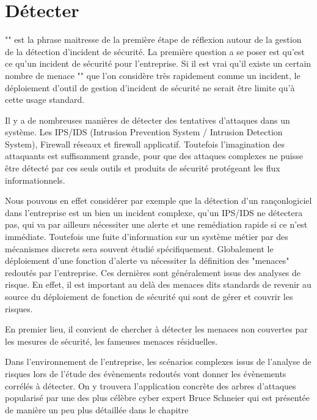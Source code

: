 \section{Détecter}

"" est la phrase maitresse de la première étape de réflexion autour de la gestion de la détection d'incident de sécurité.
La première question a se poser est qu'est ce qu'un incident de sécurité pour l'entreprise. Si il est vrai qu'il existe un certain nombre de menace "" que l'on considère très rapidement comme un incident, le déploiement d'outil de gestion d'incident de sécurité ne serait être limite qu'à cette usage standard.

Il y a de nombreuses manières de détecter des tentatives d'attaques dans un système. Les IPS/IDS (Intrusion Prevention System / Intrusion Detection System), Firewall réseaux et firewall applicatif. Toutefois l'imagination des attaquants est suffisamment grande, pour que des attaques complexes ne puisse être détecté par ces seuls outils et produits de sécurité protégeant les flux informationnels.


Nous pouvons en effet considérer par exemple que la détection d'un rançonlogiciel dans l'entreprise est un bien un incident complexe, qu'un IPS/IDS ne détectera pas,  qui va par ailleurs nécessiter une alerte et une remédiation rapide si ce n'est immédiate.
Toutefois une fuite d'information sur un système métier par des mécanismes discrets sera souvent étudié spécifiquement.
Globalement le déploiement d'une fonction d'alerte va nécessiter la définition des "menaces" redoutés par l'entreprise. 
Ces dernières sont généralement issus des analyses de risque.
En effet, il est important au delà des menaces dits standards de revenir au source du déploiement de fonction de sécurité qui sont de gérer et couvrir les risques.

En premier lieu, il convient de chercher à détecter les menaces non couvertes par les mesures de sécurité, les fameuses menaces résiduelles.

Dans l'environnement de l'entreprise, les scénarios complexes issus de l'analyse de risques lors de l'étude des évènements redoutés vont donner les évènements corrélés à détecter.
On y trouvera l'application concrète des arbres d'attaques popularisé par une des plus célèbre cyber expert Bruce Schneier \cite{schneier1999attack} qui est présentée de manière un peu plus détaillée dans le chapitre 

